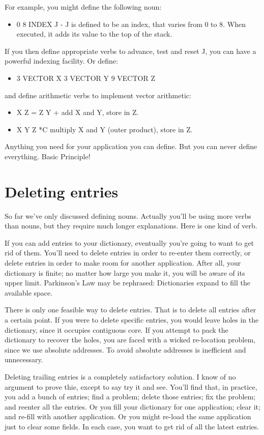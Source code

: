 \documentclass[b5paper, oneside]{book}
\begin{document}
For example, you might define the following noun:\begin{itemize}
   \item 0 8 INDEX J - J is defined to be an index, that varies from 0 to 8. When executed, it adds its value to the top of the stack.\end{itemize}
If you then define appropriate verbs to advance, test and reset J, you can have a powerful indexing facility. Or define:\begin{itemize}
   \item 3 VECTOR X  3 VECTOR Y  9 VECTOR Z\end{itemize}
and define arithmetic verbs to implement vector arithmetic:\begin{itemize}
   \item X Z = Z Y + add X and Y, store in Z.
   \item X Y Z *C multiply X and Y (outer product), store in Z.\end{itemize}
Anything you need for your application you can define. But you can never define everything. Basic Principle!

\section{Deleting entries}
So far we've only discussed defining nouns. Actually you'll be using more verbs than nouns, but they require much longer explanations. Here is one kind of verb.

If you can add entries to your dictionary, eventually you're going to want to get rid of them. You'll need to delete entries in order to re-enter them correctly, or delete entries in order to make room for another application. After all, your dictionary is finite; no matter how large you make it, you will be aware of its upper limit. Parkinson's Law may be rephrased: Dictionaries expand to fill the available space.

There is only one feasible way to delete entries. That is to delete all entries after a certain point. If you were to delete specific entries, you would leave holes in the dictionary, since it occupies contiguous core. If you attempt to pack the dictionary to recover the holes, you are faced with a wicked re-location problem, since we use absolute addresses. To avoid absolute addresses is inefficient and unnecessary.

Deleting trailing entries is a completely satisfactory solution. I know of no argument to prove thie, except to say try it and see. You'll find that, in practice, you add a bunch of entries; find a problem; delete those entries; fix the problem; and reenter all the entries. Or you fill your dictionary for one application; clear it; and re-fill with another application. Or you might re-load the same application just to clear some fields. In each case, you want to get rid of all the latest entries.
\end{document}

